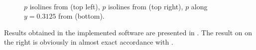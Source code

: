 \begin{figure}[H]
\centering
{}
\\
\caption{$p$ isolines from \cite{blast1} (top left), $p$ isolines from \cite{blast0} (top right), $p$ along $y = 0.3125$ from \cite{blast0} (bottom).}
\label{figure:otRef}
\end{figure}

Results obtained in the implemented software are presented in . The result on  on the right is obviously in almost exact accordance with .

